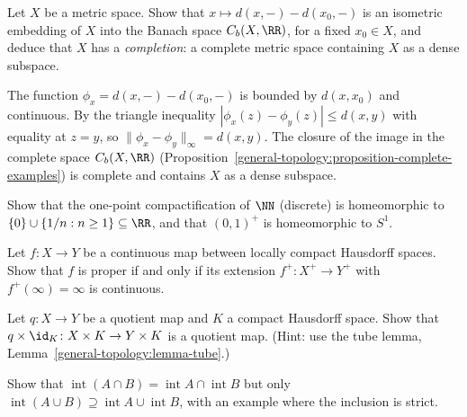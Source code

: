 \begin{exercise}\label{general-topology:exercise-completion}
Let $X$ be a metric space. Show that $x \mapsto d(x, -) - d(x_0, -)$ is an isometric embedding of $X$ into the Banach space $C_b(X, \RR)$, for a fixed
$x_0 \in X$, and deduce that $X$ has a \emph{completion}: a complete metric space containing $X$ as a dense subspace.
\end{exercise}

\begin{solution}
The function $\phi_x = d(x, -) - d(x_0, -)$ is bounded by $d(x, x_0)$ and continuous. By the triangle inequality $|\phi_x(z) - \phi_y(z)| \leq d(x, y)$ with
equality at $z = y$, so $\|\phi_x - \phi_y\|_\infty = d(x, y)$. The closure of the image in the complete space $C_b(X, \RR)$
(Proposition~\ref{general-topology:proposition-complete-examples}) is complete and contains $X$ as a dense subspace.
\end{solution}

\begin{exercise}\label{general-topology:exercise-one-point-naturals}
Show that the one-point compactification of $\NN$ (discrete) is homeomorphic to $\{0\} \cup \{1/n : n \geq 1\} \subseteq \RR$, and that
$(0, 1)^+$ is homeomorphic to $S^1$.
\end{exercise}

\begin{exercise}\label{general-topology:exercise-proper-extension}
Let $f \colon X \to Y$ be a continuous map between locally compact Hausdorff spaces. Show that $f$ is proper if and only if its extension
$f^+ \colon X^+ \to Y^+$ with $f^+(\infty) = \infty$ is continuous.
\end{exercise}

\begin{exercise}\label{general-topology:exercise-quotient-product}
Let $q \colon X \to Y$ be a quotient map and $K$ a compact Hausdorff space. Show that $q \times \id_K \colon X \times K \to Y \times K$ is a quotient map. (Hint:
use the tube lemma, Lemma~\ref{general-topology:lemma-tube}.)
\end{exercise}

\begin{exercise}\label{general-topology:exercise-interior-union}
Show that $\operatorname{int}(A \cap B) = \operatorname{int}A \cap \operatorname{int}B$ but only $\operatorname{int}(A \cup B) \supseteq \operatorname{int}A \cup \operatorname{int}B$, with an example where the
inclusion is strict.
\end{exercise}

